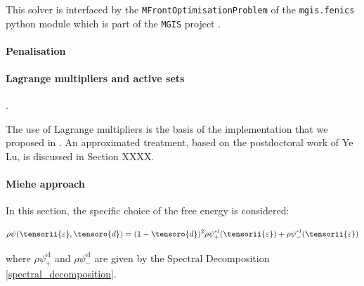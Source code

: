 \begin{infobox}
    
\end{infobox}

This solver is interfaced by the \texttt{MFrontOptimisationProblem} of the
\texttt{mgis.fenics} python module
\cite{bleyer_overview_2020, bleyer_phase-field_2020} which is part of the
\texttt{MGIS} project \cite{helfer_mfrontgenericinterfacesupport_2020}.

\paragraph{Penalisation}

\cite{gerasimov_penalization_2019}

\paragraph{Lagrange multipliers and active sets}

\cite{heister_primal-dual_2015, jodlbauer_parallel_2020}.

The use of Lagrange multipliers is the basis of the implementation that
we proposed in \cite{helfer_phase-field_2018}. An approximated treatment,
based on the postdoctoral work of Ye Lu, is discussed in Section
XXXX.

\paragraph{Miehe approach \cite{miehe_phase_2010}}

In this section, the specific choice of the free energy is considered:

\begin{equation}
    \rho \psi(\tensorii{\varepsilon}, \tensoro{d})
    =
    (1-\tensoro{d})^2 \rho \psi^{el}_{+}(\tensorii{\varepsilon})
    +
    \rho \psi^{el}_{-}(\tensorii{\varepsilon})
\end{equation}

where $\rho\psi^{\mathrm{el}}_{+}$ and
$\rho\psi^{\mathrm{el}}_{-}$ are given by the Spectral Decomposition
\eqref{spectral_decomposition}.

